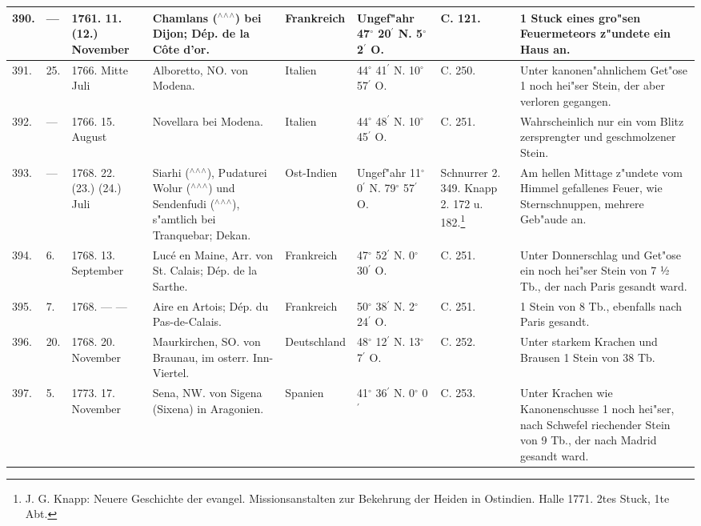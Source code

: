 \documentclass[a4paper, 8pt, oneside, polutonikogreek, german]{article}
\begin{document}
\begin{center}
\begin{longtable}{| p{4mm} | p{2mm} | p{15mm} | p{25mm} | p{16mm} | p{12mm} | p{13mm} | p{20mm} |}
        390. & --- & 1761. 11. (12.) November & Chamlans ($^\wedge$$^\wedge$$^\wedge$) bei Dijon; Dép. de la Côte d’or. & Frankreich & Ungef"ahr 47$^\circ$ 20$^\prime$ N. 5$^\circ$ 2$^\prime$ O. & C. 121. & 1 Stuck eines gro"sen Feuermeteors z"undete ein Haus an. \\ \hline
        391. & 25. & 1766. Mitte Juli & Alboretto, NO. von Modena. & Italien & 44$^\circ$ 41$^\prime$ N. 10$^\circ$ 57$^\prime$ O. & C. 250. & Unter kanonen"ahnlichem Get"ose 1 noch hei"ser Stein, der aber verloren gegangen. \\ \hline
        392. & --- & 1766. 15. August & Novellara bei Modena. & Italien & 44$^\circ$ 48$^\prime$ N. 10$^\circ$ 45$^\prime$ O. & C. 251. & Wahrscheinlich nur ein vom Blitz zersprengter und geschmolzener Stein. \\ \hline
        393. & --- & 1768. 22. (23.) (24.) Juli & Siarhi ($^\wedge$$^\wedge$$^\wedge$), Pudaturei Wolur ($^\wedge$$^\wedge$$^\wedge$) und Sendenfudi ($^\wedge$$^\wedge$$^\wedge$), s"amtlich bei Tranquebar; Dekan. & Ost-Indien & Ungef"ahr 11$^\circ$ 0$^\prime$ N. 79$^\circ$ 57$^\prime$ O. & Schnurrer 2. 349. Knapp 2. 172 u. 182.\footnote{J. G. Knapp: Neuere Geschichte der evangel. Missionsanstalten zur Bekehrung der Heiden in Ostindien. Halle 1771. 2tes Stuck, 1te Abt.} & Am hellen Mittage z"undete vom Himmel gefallenes Feuer, wie Sternschnuppen, mehrere Geb"aude an. \\ \hline
        394. & 6. & 1768. 13. September & Lucé en Maine, Arr. von St. Calais; Dép. de la Sarthe. & Frankreich & 47$^\circ$ 52$^\prime$ N. 0$^\circ$ 30$^\prime$ O. & C. 251. & Unter Donnerschlag und Get"ose ein noch hei"ser Stein von 7 ½ Tb., der nach Paris gesandt ward. \\ \hline
        395. & 7. & 1768. --- --- & Aire en Artois; Dép. du Pas-de-Calais. & Frankreich & 50$^\circ$ 38$^\prime$ N. 2$^\circ$ 24$^\prime$ O. & C. 251. & 1 Stein von 8 Tb., ebenfalls nach Paris gesandt. \\ \hline
        396. & 20. & 1768. 20. November & Maurkirchen, SO. von Braunau, im osterr. Inn-Viertel. & Deutschland & 48$^\circ$ 12$^\prime$ N. 13$^\circ$ 7$^\prime$ O. & C. 252. & Unter starkem Krachen und Brausen 1 Stein von 38 Tb. \\ \hline
        397. & 5. & 1773. 17. November & Sena, NW. von Sigena (Sixena) in Aragonien. & Spanien & 41$^\circ$ 36$^\prime$ N. 0$^\circ$ 0$^\prime$ & C. 253. & Unter Krachen wie Kanonenschusse 1 noch hei"ser, nach Schwefel riechender Stein von 9 Tb., der nach Madrid gesandt ward. \\ \hline

\end{longtable}
\end{center}
\end{document}
